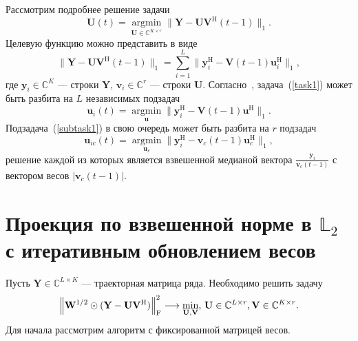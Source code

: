 \documentclass[specialist,
               substylefile = spbu.rtx,
               subf,href,colorlinks=true, 12pt]{disser}
\DeclareMathOperator*{\argmin}{argmin}
\begin{document}
Рассмотрим подробнее решение задачи
\begin{equation}\label{task1}
	\mathbf{U}(t) = \argmin\limits_{\mathbf{U}\in \mathbb{C}^{K\times r}} \|\mathbf{Y}-\mathbf{U}\mathbf{V}^{\mathrm{H}}(t-1)\|_1.
\end{equation}
Целевую функцию можно представить в виде $$\|\mathbf{Y}-\mathbf{U}\mathbf{V}^{\mathrm{H}}(t-1)\|_1 = \sum\limits_{i=1}^{L} \|\mathbf{y}_i^{\mathrm{H}}-\mathbf{V}(t-1)\mathbf{u}^{\mathrm{H}}_i \|_1, $$ где $\mathbf{y}_i\in \mathbb{C}^K$ --- строки $\mathbf{Y}$, $\mathbf{v}_i\in\mathbb{C}^r$ --- строки $\mathbf{U}$.
Согласно~\cite{KeKanade}, задача~(\ref{task1}) может быть разбита на $L$ независимых подзадач
\begin{equation}\label{subtask1}
	\mathbf{u}_i(t) = \argmin\limits_{\mathbf{u}}\|\mathbf{y}_i^{\mathrm{H}}-\mathbf{V}(t-1)\mathbf{u}^{\mathrm{H}} \|_1.
\end{equation}
 Подзадача~(\ref{subtask1}) в свою очередь может быть разбита на $r$ подзадач
\begin{equation}\label{subtask1}
	\mathbf{u}_{ic}(t) = \argmin\limits_{\mathbf{u}_c}\|\mathbf{y}_{i}^{\mathrm{H}}-\mathbf{v}_c(t-1)\mathbf{u}_c^{\mathrm{H}} \|_1,
\end{equation}
решение каждой из которых является взвешенной медианой вектора $\frac{\mathbf{y}_i}{\mathbf{v}_c(t-1)}$ с вектором весов $|\mathbf{v}_c(t-1)|$.


\section{Проекция по взвешенной норме в $\mathbb{L}_2$ с итеративным обновлением весов}

Пусть $\mathbf{Y} \in \mathbb{C}^{L\times K}$ --- траекторная матрица ряда.
Необходимо решить задачу
\begin{equation*}
		\norm{\mathbf{W}^{1/2}\odot(\mathbf{Y}-\mathbf{U}\mathbf{V}^{\mathrm{H}})}^2_\mathrm{F} \longrightarrow \min_{\mathbf{U},\mathbf{V}}, \, \mathbf{U} \in \mathbb{C}^{L\times r}, \mathbf{V} \in \mathbb{C}^{K\times r}.
\end{equation*}
Для начала рассмотрим алгоритм с фиксированной матрицей весов.
\end{document}
